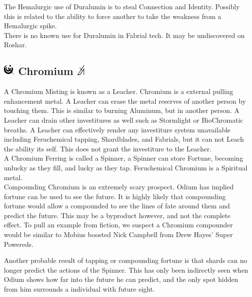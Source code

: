 \documentclass[conference]{IEEEtran}
\begin{document}
The Hemalurgic use of Duralumin is to steal Connection and Identity.\cite{dl-comp}  Possibly this is related to the ability to force another to take the weakness from a Hemalurgic spike.\cite{BoM-CH27}\\

There is no known use for Duralumin in Fabrial tech.  It may be undiscovered on Roshar.
\subsection*{\includegraphics[height=1em]{images/Chromium.png}  Chromium \includegraphics[height=1em]{images/Chromium_(Feruchemy).png}}
A Chromium Misting is known as a Leacher.\cite{ARS}  Chromium is a external pulling enhancement metal.\cite{AL-TB} A Leacher can erase the metal reserves of another person by touching them.\cite{ARS}  This is similar to burning Aluminum, but in another person.  A Leacher can drain other investitures as well such as Stormlight\cite{leech-storm} or BioChromatic breaths.\cite{leech-breath}  A Leacher can effectively render any investiture system unavailable including Feruchemical tapping,\cite{leech-fe} Shardblades,\cite{leech-blade} and Fabrials,\cite{leech-disarm} but it can not Leach the ability its self.  This does not grant the investiture to the Leacher.\cite{leech-disarm}\\

A Chromium Ferring is called a Spinner,\cite{ARS} a Spinner can store Fortune, becoming unlucky as they fill, and lucky as they tap.\cite{ARS}  Feruchemical Chromium is a Spiritual metal.\cite{FE-TB}\\

Compounding Chromium is an extremely scary prospect.  Odium has implied fortune can be used to see the future.\cite{OB-CH122}  It is highly likely that compounding fortune would allow a compounded to see the lines of fate around them and predict the future.\cite{atium-forutne}  This may be a byproduct however, and not the complete effect.  To pull an example from fiction, we suspect a Chromium compounder would be similar to Mobius boosted Nick Campbell from Drew Hayes' Super Powereds.\cite{nick-cambll}

Another probable result of tapping or compounding fortune is that shards can no longer predict the actions of the Spinner.  This has only been indirectly seen when Odium shows how far into the future he can predict, and the only spot hidden from him surrounds a individual with future sight.\cite{RoW-I6}\\
\end{document}
